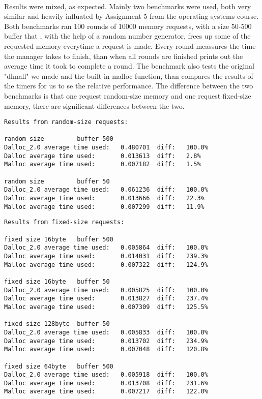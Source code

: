 \documentclass[11pt]{article}
\begin{document}
\paragraph{}
Results were mixed, as expected. Mainly two benchmarks were used, both very similar and heavily influated by Assignment 5 from the operating systems course.
Both benchmarks ran 100 rounds of 10000 memory requests, with a size 50-500 buffer that , with the help of a random number generator, frees up some of the 
requested memory everytime a request is made. Every round meassures the time the manager takes to finish, than when all rounds are finished prints out the 
average time it took to complete a round. The benchmark also tests the original "dlmall" we made and the built in malloc function, than compares the results
of the timers for us to se the relative performance. 
The difference between the two benchmarks is that one request random-size memory and one request fixed-size memory, there are significant differences 
between the two.

\begin{verbatim}
Results from random-size requests:

random size         buffer 500
Dalloc_2.0 average time used:   0.480701  diff:   100.0%
Dalloc average time used:       0.013613  diff:   2.8%
Malloc average time used:       0.007182  diff:   1.5%

random size         buffer 50
Dalloc_2.0 average time used:   0.061236  diff:   100.0%
Dalloc average time used:       0.013666  diff:   22.3%
Malloc average time used:       0.007299  diff:   11.9%
\end{verbatim}

\begin{verbatim}
Results from fixed-size requests:

fixed size 16byte   buffer 500
Dalloc_2.0 average time used:   0.005864  diff:   100.0%
Dalloc average time used:       0.014031  diff:   239.3%
Malloc average time used:       0.007322  diff:   124.9%

fixed size 16byte   buffer 50
Dalloc_2.0 average time used:   0.005825  diff:   100.0%
Dalloc average time used:       0.013827  diff:   237.4%
Malloc average time used:       0.007309  diff:   125.5%

fixed size 128byte  buffer 50
Dalloc_2.0 average time used:   0.005833  diff:   100.0%
Dalloc average time used:       0.013702  diff:   234.9%
Malloc average time used:       0.007048  diff:   120.8%

fixed size 64byte   buffer 500
Dalloc_2.0 average time used:   0.005918  diff:   100.0%
Dalloc average time used:       0.013708  diff:   231.6%
Malloc average time used:       0.007217  diff:   122.0%
\end{verbatim}
\end{document}
